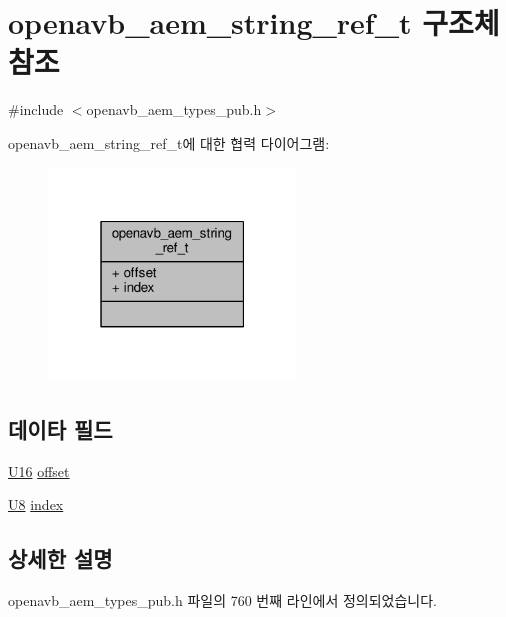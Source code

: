 \hypertarget{structopenavb__aem__string__ref__t}{}\section{openavb\+\_\+aem\+\_\+string\+\_\+ref\+\_\+t 구조체 참조}
\label{structopenavb__aem__string__ref__t}


{\ttfamily \#include $<$openavb\+\_\+aem\+\_\+types\+\_\+pub.\+h$>$}



openavb\+\_\+aem\+\_\+string\+\_\+ref\+\_\+t에 대한 협력 다이어그램\+:
\nopagebreak
\begin{figure}[H]
\begin{center}
\leavevmode
\includegraphics[width=187pt]{structopenavb__aem__string__ref__t__coll__graph}
\end{center}
\end{figure}
\subsection*{데이타 필드}
\begin{DoxyCompactItemize}
\item 
\hyperlink{openavb__types__base__pub_8h_a0a0a322d5fa4a546d293a77ba8b4a71f}{U16} \hyperlink{structopenavb__aem__string__ref__t_a8a81b1e8e8c08716798408ae31c247df}{offset}
\item 
\hyperlink{openavb__types__base__pub_8h_aa63ef7b996d5487ce35a5a66601f3e73}{U8} \hyperlink{structopenavb__aem__string__ref__t_a0078423694b8e1d8bbb34db246be30ed}{index}
\end{DoxyCompactItemize}


\subsection{상세한 설명}


openavb\+\_\+aem\+\_\+types\+\_\+pub.\+h 파일의 760 번째 라인에서 정의되었습니다.



